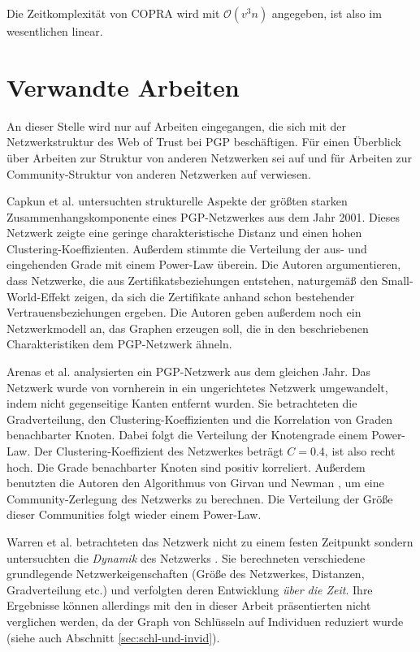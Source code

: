 Die Zeitkomplexität von COPRA wird mit $\mathcal{O}(v^3n)$
angegeben, ist also im wesentlichen linear.

\section{Verwandte Arbeiten}
\label{ch:Grundlagen:sec:RelatedWork}

An dieser Stelle wird nur auf Arbeiten eingegangen, die sich mit der
Netzwerkstruktur des Web of Trust bei PGP beschäftigen. Für einen
Überblick über Arbeiten zur Struktur von anderen Netzwerken sei auf
\cite{newman:167} und für Arbeiten zur Community-Struktur von anderen
Netzwerken auf \cite{Fortunato2010} verwiesen.

Capkun et al. \cite{Capkun2002} untersuchten strukturelle Aspekte der
größten starken Zusammenhangskomponente eines PGP-Netzwerkes aus dem
Jahr 2001. Dieses Netzwerk zeigte eine geringe charakteristische
Distanz und einen hohen Clustering-Koeffizienten. Außerdem stimmte die
Verteilung der aus- und eingehenden Grade mit einem Power-Law
überein. Die Autoren argumentieren, dass Netzwerke, die aus
Zertifikatsbeziehungen entstehen, naturgemäß den Small-World-Effekt
zeigen, da sich die Zertifikate anhand schon bestehender
Vertrauensbeziehungen ergeben. Die Autoren geben außerdem noch ein
Netzwerkmodell an, das Graphen erzeugen soll, die in den
beschriebenen Charakteristiken dem PGP-Netzwerk ähneln.

Arenas et al. \cite{Boguna2004} analysierten ein PGP-Netzwerk aus dem
gleichen Jahr. Das Netzwerk wurde von vornherein in ein ungerichtetes
Netzwerk umgewandelt, indem nicht gegenseitige Kanten entfernt
wurden. Sie betrachteten die Gradverteilung, den
Clustering-Koeffizienten und die Korrelation von Graden benachbarter
Knoten. Dabei folgt die Verteilung der Knotengrade einem
Power-Law. Der Clustering-Koeffizient des Netzwerkes beträgt $C=0.4$,
ist also recht hoch. Die Grade benachbarter Knoten sind positiv
korreliert. Außerdem benutzten die Autoren den Algorithmus von Girvan
und Newman \cite{Newman2004}, um eine Community-Zerlegung des Netzwerks
zu berechnen. Die Verteilung der Größe dieser Communities folgt wieder
einem Power-Law.

Warren et al. betrachteten das Netzwerk nicht zu einem festen
Zeitpunkt sondern untersuchten die \emph{Dynamik} des
Netzwerks \cite{Warren2007}. Sie berechneten verschiedene grundlegende
Netzwerkeigenschaften (Größe des Netzwerkes, Distanzen,
Gradverteilung etc.) und verfolgten deren Entwicklung \emph{über die
  Zeit}. Ihre Ergebnisse können allerdings mit den in dieser Arbeit
präsentierten nicht verglichen werden, da der Graph von Schlüsseln
auf Individuen reduziert wurde (siehe auch Abschnitt
\ref{sec:schl-und-invid}).

